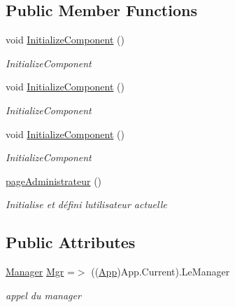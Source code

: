 \subsection*{Public Member Functions}
\begin{DoxyCompactItemize}
\item 
void \hyperlink{classnewPizza1_1_1pageAdministrateur_a8ce68fc7fc92670f56ef3dabb906c9d0}{Initialize\+Component} ()
\begin{DoxyCompactList}\small\item\em Initialize\+Component \end{DoxyCompactList}\item 
void \hyperlink{classnewPizza1_1_1pageAdministrateur_a8ce68fc7fc92670f56ef3dabb906c9d0}{Initialize\+Component} ()
\begin{DoxyCompactList}\small\item\em Initialize\+Component \end{DoxyCompactList}\item 
void \hyperlink{classnewPizza1_1_1pageAdministrateur_a8ce68fc7fc92670f56ef3dabb906c9d0}{Initialize\+Component} ()
\begin{DoxyCompactList}\small\item\em Initialize\+Component \end{DoxyCompactList}\item 
\hyperlink{classnewPizza1_1_1pageAdministrateur_a3df7325db92c6908055020fc136b6684}{page\+Administrateur} ()
\begin{DoxyCompactList}\small\item\em Initialise et défini l\textquotesingle{}utilisateur actuelle \end{DoxyCompactList}\end{DoxyCompactItemize}
\subsection*{Public Attributes}
\begin{DoxyCompactItemize}
\item 
\hyperlink{classModele_1_1Manager}{Manager} \hyperlink{classnewPizza1_1_1pageAdministrateur_a875c5374259f61887e976a3ba2d6c2e1}{Mgr} =$>$ ((\hyperlink{classnewPizza1_1_1App}{App})App.\+Current).Le\+Manager
\begin{DoxyCompactList}\small\item\em appel du manager \end{DoxyCompactList}\end{DoxyCompactItemize}


